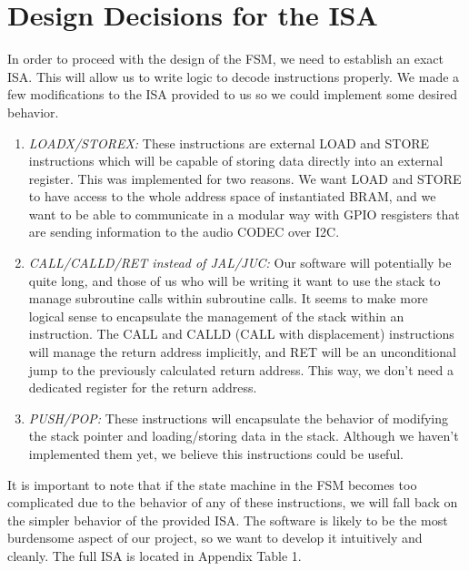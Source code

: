 \documentclass[conference]{IEEEtran}
\begin{document}
\section{Design Decisions for the ISA}
In order to proceed with the design of the FSM, we need to establish an exact ISA. This will allow us to write logic to decode instructions properly. We made a few modifications to the ISA provided to us so we could implement some desired behavior.
\begin{enumerate}
    \item \textit{LOADX/STOREX:} These instructions are external LOAD and STORE instructions which will be capable of storing data directly into an external register. This was implemented for two reasons. We want LOAD and STORE to have access to the whole address space of instantiated BRAM, and we want to be able to communicate in a modular way with GPIO resgisters that are sending information to the audio CODEC over I2C.
    \item \textit{CALL/CALLD/RET instead of JAL/JUC:} Our software will potentially be quite long, and those of us who will be writing it want to use the stack to manage subroutine calls within subroutine calls. It seems to make more logical sense to encapsulate the management of the stack within an instruction. The CALL and CALLD (CALL with displacement) instructions will manage the return address implicitly, and RET will be an unconditional jump to the previously calculated return address. This way, we don't need a dedicated register for the return address.
    \item \textit{PUSH/POP:} These instructions will encapsulate the behavior of modifying the stack pointer and loading/storing data in the stack. Although we haven't implemented them yet, we believe this instructions could be useful.
\end{enumerate}
It is important to note that if the state machine in the FSM becomes too complicated due to the behavior of any of these instructions, we will fall back on the simpler behavior of the provided ISA. The software is likely to be the most burdensome aspect of our project, so we want to develop it intuitively and cleanly. The full ISA is located in Appendix Table 1.
\end{document}
